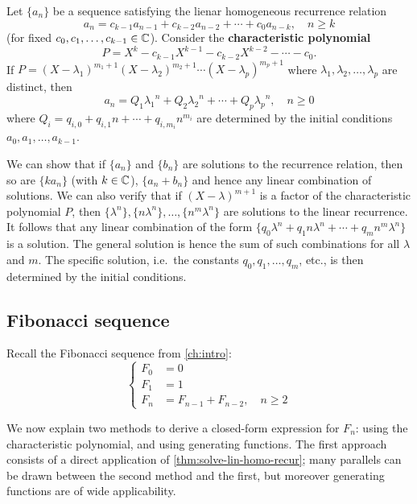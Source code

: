 \documentclass[a4paper, 12pt]{report}
\begin{document}
\begin{thm}\label{thm:solve-lin-homo-recur}
Let $\{a_n\}$ be a sequence satisfying the lienar homogeneous recurrence relation
\[a_n = c_{k - 1} a_{n - 1} + c_{k - 2} a_{n - 2} + \cdots + c_0 a_{n - k}, \quad n \geq k\]
(for fixed $c_0, c_1, \dots, c_{k - 1} \in \mathbb{C}$). Consider the \textbf{characteristic polynomial} 
\[P = X^k - c_{k - 1} X^{k - 1} - c_{k - 2} X^{k - 2} - \cdots - c_0.\]
If $P = (X - \lambda_1)^{m_1 + 1} (X - \lambda_2)^{m_2 + 1} \cdots (X - \lambda_p)^{m_p + 1}$
where $\lambda_1, \lambda_2, \dots, \lambda_p$ are distinct, then 
\[a_n = Q_1 {\lambda_1}^n + Q_2 {\lambda_2}^n + \cdots + Q_p {\lambda_p}^n, \quad n \geq 0\]
where $Q_i = q_{i, 0} + q_{i, 1} n + \cdots + q_{i, m_i} n^{m_i}$ are determined by the initial conditions $a_0, a_1, \dots, a_{k - 1}$.
\end{thm}
\begin{sproof}
We can show that if $\{a_n\}$ and $\{b_n\}$ are solutions to the recurrence relation, then so are $\{k a_n\}$ (with $k \in \mathbb{C}$), $\{a_n + b_n\}$ and hence any linear combination of solutions. We can also verify that if $(X - \lambda)^{m + 1}$ is a factor of the characteristic polynomial $P$, then $\{\lambda^n\}, \{n \lambda^n\}, \dots, \{n^m \lambda^n\}$ are solutions to the linear recurrence. It follows that any linear combination of the form $\{q_0 \lambda^n + q_1 n \lambda^n + \cdots + q_m n^m \lambda^n\}$ is a solution. The general solution is hence the sum of such combinations for all $\lambda$ and $m$. The specific solution, i.e.\ the constants $q_0, q_1, \dots, q_m$, etc., is then determined by the initial conditions.
\end{sproof}

\subsection{Fibonacci sequence}
Recall the Fibonacci sequence from \cref{ch:intro}:
\[
\begin{cases}
F_0 &= 0\\
F_1 &= 1\\
F_n &= F_{n - 1} + F_{n - 2}, \quad n \geq 2
\end{cases}
\]

We now explain two methods to derive a closed-form expression for $F_n$: using the characteristic polynomial, and using generating functions. The first approach consists of a direct application of \cref{thm:solve-lin-homo-recur}; many parallels can be drawn between the second method and the first, but moreover generating functions are of wide applicability.
\end{document}
